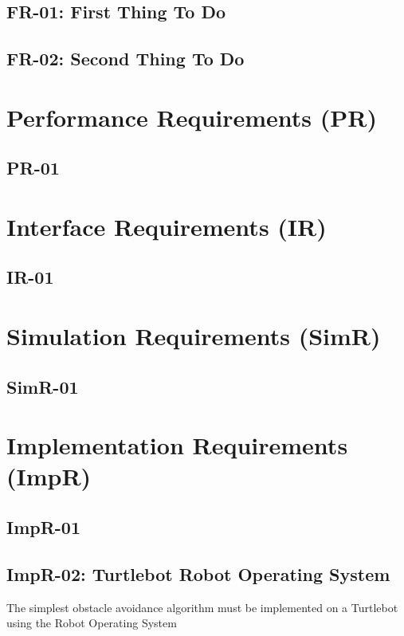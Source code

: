 \documentclass[]{report}
\begin{document}
\subsection{FR-01: First Thing To Do}

\subsection{FR-02: Second Thing To Do}

\section{Performance Requirements (PR)}

\subsection{PR-01}

\section{Interface Requirements (IR)}

\subsection{IR-01}

\section{Simulation Requirements (SimR)}

\subsection{SimR-01}

\section{Implementation Requirements (ImpR)}

\subsection{ImpR-01}

\subsection{ImpR-02: Turtlebot Robot Operating System}

The simplest obstacle avoidance algorithm must be implemented on a Turtlebot using the Robot Operating System
\end{document}
